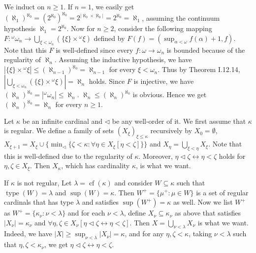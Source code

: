 \documentclass[12pt]{article}
\newcommand{\type}{\mathop{\mathrm{type}}}
\newcommand{\cf}{\mathop{\mathrm{cf}}}
\theoremstyle{definition}
\newenvironment{customthm}[1]
  {\renewcommand\theinnercustomthm{#1}\innercustomthm}
  {\endinnercustomthm}
\begin{document}
\begin{customthm}{I.13.36}
  We induct on $n\geq1$. If $n=1$, we easily get $(\aleph_1)^{\aleph_0}=(2^{\aleph_0})^{\aleph_0}=2^{|\aleph_0\times\aleph_0|}=2^{\aleph_0}=\aleph_1$, assuming the continuum hypothesis $\aleph_1=2^{\aleph_0}$. Now for $n\geq2$, consider the following mapping $F:{}^\omega\omega_n\rightarrow\bigcup_{\xi<\omega_n}(\{\xi\}\times{}^\omega\xi)$ defined by $F(f)=(\sup_{\alpha<\omega}f(\alpha)+1,f)$. Note that this $F$ is well-defined since every $f:\omega\rightarrow\omega_n$ is bounded because of the regularity of $\aleph_n$. Assuming the inductive hypothesis, we have $|\{\xi\}\times{}^\omega\xi|\leq(\aleph_{n-1})^{\aleph_0}=\aleph_{n-1}$ for every $\xi<\omega_n$. Thus by Theorem I.12.14, $|\bigcup_{\xi<\omega_n}(\{\xi\}\times{}^\omega\xi)|=\aleph_n$ holds. Since $F$ is injective, we have $(\aleph_n)^{\aleph_0}=|{}^\omega\omega_n|\leq\aleph_n$. $\aleph_n\leq(\aleph_n)^{\aleph_0}$ is obvious. Hence we get $(\aleph_n)^{\aleph_0}=\aleph_n$ for every $n\geq1$.
\end{customthm}

\begin{customthm}{I.13.37}
  Let $\kappa$ be an infinite cardinal and $\triangleleft$ be any well-order of it. We first assume that $\kappa$ is regular. We define a family of sets $(X_\xi)_{\xi\leq\kappa}$ recursively by $X_0=\emptyset$, $X_{\xi+1}=X_\xi\cup\{\min_\triangleleft\{\zeta<\kappa:\forall\eta\in X_\xi[\eta<\zeta]\}\}$ and $X_\eta=\bigcup_{\xi<\eta}X_\xi$. Note that this is well-defined due to the regularity of $\kappa$. Moreover, $\eta\triangleleft\zeta\leftrightarrow\eta<\zeta$ holds for $\eta,\zeta\in X_\xi$. Then $X_\kappa$, which has cardinality $\kappa$, is what we want.

  If $\kappa$ is not regular, Let $\lambda=\cf(\kappa)$ and consider $W\subseteq\kappa$ such that $\type(W)=\lambda$ and $\sup(W)=\kappa$. Then $W^+=\{\mu^+:\mu\in W\}$ is a set of regular cardinals that has type $\lambda$ and satisfies $\sup(W^+)=\kappa$ as well. Now we list $W^+$ as $W^+=\{\kappa_\nu:\nu<\lambda\}$ and for each $\nu<\lambda$, define $X_\nu\subseteq\kappa_\nu$ as above that satisfies $|X_\nu|=\kappa_\nu$ and $\forall\eta,\zeta\in X_\nu[\eta\triangleleft\zeta\leftrightarrow\eta<\zeta]$. Then $X=\bigcup_{\nu<\lambda}X_\nu$ is what we want. Indeed, we have $|X|\geq\sup_{\nu<\lambda}|X_\nu|=\kappa$, and for any $\eta,\zeta<\kappa$, taking $\nu<\lambda$ such that $\eta,\zeta<\kappa_\nu$, we get $\eta\triangleleft\zeta\leftrightarrow\eta<\zeta$.
\end{customthm}
\end{document}
